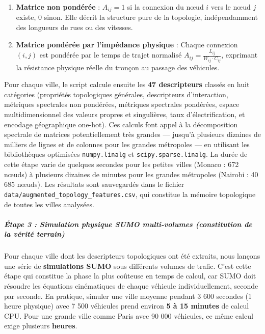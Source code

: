\documentclass[10pt, a4paper]{article}
\providecommand{\tightlist}{}
\begin{document}
\begin{enumerate}
\def\labelenumi{\arabic{enumi}.}
\tightlist
\item
  \textbf{Matrice non pondérée} : \(A_{ij} = 1\) si la connexion du nœud
  \(i\) vers le nœud \(j\) existe, \(0\) sinon. Elle décrit la structure
  pure de la topologie, indépendamment des longueurs de rues ou des
  vitesses.
\item
  \textbf{Matrice pondérée par l'impédance physique} : Chaque connexion
  \((i, j)\) est pondérée par le temps de trajet normalisé
  \(A_{ij} = \frac{L_{ij}}{W_{ij} \cdot C_{ij}}\), exprimant la
  résistance physique réelle du tronçon au passage des véhicules.
\end{enumerate}

Pour chaque ville, le script calcule ensuite les \textbf{47
descripteurs} classés en huit catégories (propriétés topologiques
générales, descripteurs d'interaction, métriques spectrales non
pondérées, métriques spectrales pondérées, espace multidimensionnel des
valeurs propres et singulières, taux d'électrification, et encodage
géographique one-hot). Ces calculs font appel à la décomposition
spectrale de matrices potentiellement très grandes --- jusqu'à plusieurs
dizaines de milliers de lignes et de colonnes pour les grandes
métropoles --- en utilisant les bibliothèques optimisées
\texttt{numpy.linalg} et \texttt{scipy.sparse.linalg}. La durée de cette
étape varie de quelques secondes pour les petites villes (Monaco : 672
nœuds) à plusieurs dizaines de minutes pour les grandes métropoles
(Nairobi : 40 685 nœuds). Les résultats sont sauvegardés dans le fichier
\texttt{data/augmented\_topology\_features.csv}, qui constitue la
mémoire topologique de toutes les villes analysées.

\subparagraph{Étape 3 : Simulation physique SUMO multi-volumes
(constitution de la vérité
terrain)}\label{uxe9tape-3-simulation-physique-sumo-multi-volumes-constitution-de-la-vuxe9rituxe9-terrain}

Pour chaque ville dont les descripteurs topologiques ont été extraits,
nous lançons une série de \textbf{simulations SUMO} sous différents
volumes de trafic. C'est cette étape qui constitue la phase la plus
coûteuse en temps de calcul, car SUMO doit résoudre les équations
cinématiques de chaque véhicule individuellement, seconde par seconde.
En pratique, simuler une ville moyenne pendant 3 600 secondes (1 heure
physique) avec 7 500 véhicules prend environ \textbf{5 à 15 minutes} de
calcul CPU. Pour une grande ville comme Paris avec 90 000 véhicules, ce
même calcul exige plusieurs \textbf{heures}.
\end{document}
